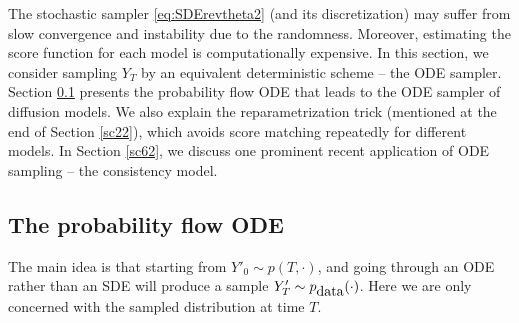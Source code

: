 \documentclass[letterpaper,11pt,reqno]{amsart}
\numberwithin{equation}{section}
\begin{document}
\quad The stochastic sampler \eqref{eq:SDErevtheta2} (and
its discretization)
may suffer from slow convergence and instability due to the randomness.
Moreover, estimating the score function for each model is computationally expensive.
In this section, we consider sampling $Y_T$ by an equivalent 
deterministic scheme -- the ODE sampler.
Section \ref{sc61} presents the probability flow ODE 
that leads to the ODE sampler of diffusion models.
We also explain the reparametrization trick (mentioned at the end of Section \ref{sc22}),
which avoids score matching repeatedly for different models.
In Section \ref{sc62}, 
we discuss one prominent recent application of ODE sampling -- the consistency model.

\subsection{The probability flow ODE}
\label{sc61}

The main idea is that
starting from $Y'_0 \sim p(T, \cdot)$,
and going through an ODE rather than an SDE
will produce a sample $Y'_T \sim p_{\tiny \mbox{data}}(\cdot)$. 
Here we are only concerned with the sampled distribution at time $T$.
\end{document}
